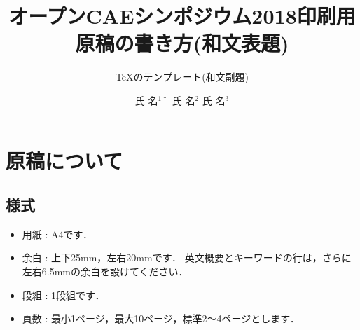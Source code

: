 \documentclass{ltjoc}
\title{オープンCAEシンポジウム2018印刷用原稿の書き方(和文表題)}
\subtitle{\TeX のテンプレート(和文副題)}
\author{%
氏 名$^{1\dagger}$%
\hspace{1\zw}%
氏 名$^{2}$%
\hspace{1\zw}%
氏 名$^{3}$%
}
\affiliation{%
${}^{1}$所属%
\hspace{1\zw}%
${}^{2}$所属%
\hspace{1\zw}%
${}^{3}$所属%
}
\begin{document}
\maketitle
\section{原稿について}
\subsection{様式}
\begin{itemize}
\item 用紙 : A4です．
\item 余白 : 上下25mm，左右20mmです．
  英文概要とキーワードの行は，さらに左右6.5mmの余白を設けてください．
\item 段組 : 1段組です．
\item 頁数 : 最小1ページ，最大10ページ，標準2〜4ページとします．
\end{itemize}
\end{document}
